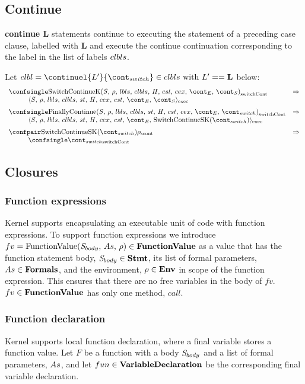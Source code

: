 \documentclass{article}
\begin{document}
\subsection{Continue}
\textbf{continue L} statements continue to executing the statement of a preceding case clause, labelled with \textbf{L} and execute the continue continuation corresponding to the label in the list of labels $clbls$.

Let $\clbl = \continuel{L'}{\switchcont} \in \clbls \textrm{ with } L' == \mathbf{L}$ below:
\[
  \begin{array}{lcl}
	\switchconf{\ContinueK}
	& \Rightarrow \\
	\hspace{10mm}\execconf{\stmt}{\env}{\lbls}{\clbls}{\handler}{\cex}{\cstrace}{\econt}{\scont}\\[2mm]

	\switchconf{\FinallyContinue{\stmt}{\switchcont}}
	& \Rightarrow \\
	\hspace{10mm}\execconf{\stmt}{\env}{\lbls}{\clbls}{\handler}{\cex}{\cstrace}{\econt}{\mathrm{SwitchContinueSK}(\switchcont)}\\[2mm]

	\scontconf{\mathrm{SwitchContinueSK}(\switchcont)}{\env}
	& \Rightarrow \\
	\hspace{10mm}\switchconf{\switchcont}
  \end{array}
\]
\subsection{Closures}
\subsubsection{Function expressions}

Kernel supports encapsulating an executable unit of code with function expressions.
To support function expressions we introduce $fv = \mathrm{FunctionValue}({\mathit{S}_{body}},\,{As},\,{\rho}) \in \mathbf{FunctionValue}$ as a value that has the function statement body, $\mathit{S}_{body} \in \mathbf{Stmt}$, its list of formal parameters, $As \in \mathbf{Formals}$, and the environment, $\rho \in \mathbf{Env}$ in scope of the function expression.
This ensures that there are no free variables in the body of $fv$.
$fv \in \mathbf{FunctionValue}$ has only one method, $call$.

\subsubsection{Function declaration}
Kernel supports local function declaration, where a final variable stores a function value.
Let $F$ be a function with a body $\mathit{S}_{body}$ and a list of formal parameters, $As$, and let $fun \in \mathbf{VariableDeclaration}$ be the corresponding final variable declaration.
\end{document}
